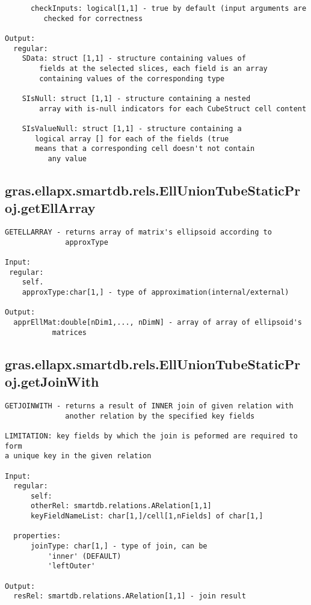 \begin{verbatim}
      checkInputs: logical[1,1] - true by default (input arguments are
         checked for correctness

Output:
  regular:
    SData: struct [1,1] - structure containing values of
        fields at the selected slices, each field is an array
        containing values of the corresponding type

    SIsNull: struct [1,1] - structure containing a nested
        array with is-null indicators for each CubeStruct cell content

    SIsValueNull: struct [1,1] - structure containing a
       logical array [] for each of the fields (true
       means that a corresponding cell doesn't not contain
          any value
\end{verbatim}
\subsection{\texorpdfstring{gras.ellapx.smartdb.rels.EllUnionTubeStaticProj.getEllArray}{getEllArray}}\label{method:gras.ellapx.smartdb.rels.EllUnionTubeStaticProj.getEllArray}
\begin{verbatim}
GETELLARRAY - returns array of matrix's ellipsoid according to
              approxType

Input:
 regular:
    self.
    approxType:char[1,] - type of approximation(internal/external)

Output:
  apprEllMat:double[nDim1,..., nDimN] - array of array of ellipsoid's
           matrices
\end{verbatim}
\subsection{\texorpdfstring{gras.ellapx.smartdb.rels.EllUnionTubeStaticProj.getJoinWith}{getJoinWith}}\label{method:gras.ellapx.smartdb.rels.EllUnionTubeStaticProj.getJoinWith}
\begin{verbatim}
GETJOINWITH - returns a result of INNER join of given relation with
              another relation by the specified key fields

LIMITATION: key fields by which the join is peformed are required to form
a unique key in the given relation

Input:
  regular:
      self:
      otherRel: smartdb.relations.ARelation[1,1]
      keyFieldNameList: char[1,]/cell[1,nFields] of char[1,]

  properties:
      joinType: char[1,] - type of join, can be
          'inner' (DEFAULT)
          'leftOuter'

Output:
  resRel: smartdb.relations.ARelation[1,1] - join result
\end{verbatim}
